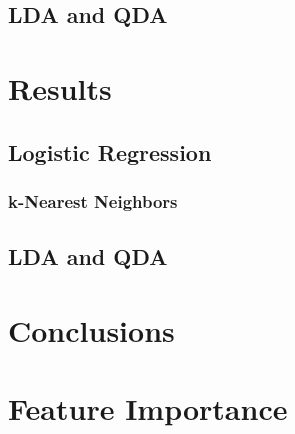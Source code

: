 \documentclass{article}
\begin{document}
\subsection{LDA and QDA}

\section{Results}

\subsection{Logistic Regression}

\subsubsection{k-Nearest Neighbors}

\subsection{LDA and QDA}

\section{Conclusions}

\section{Feature Importance}
\end{document}
